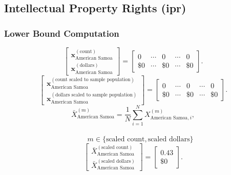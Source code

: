 \subsection{Intellectual Property Rights (\gls{ipr})}\label{sec:ipr}
\subsubsection{Lower Bound Computation}
\[
\begin{bmatrix}
\mathbf{x}_{\text{American Samoa}}^{(\text{count})}\\
\mathbf{x}_{\text{American Samoa}}^{(\text{dollars})}
\end{bmatrix}
=
\begin{bmatrix}
0 & \cdots & 0 & \cdots & 0\\
\$0 & \cdots & \$0 & \cdots & \$0
\end{bmatrix}.
\]
\[
\begin{bmatrix}
\mathbf{x}_{\text{American Samoa}}^{(\text{count scaled to sample population})}\\
\mathbf{x}_{\text{American Samoa}}^{(\text{dollars scaled to sample population})}
\end{bmatrix}
=
\begin{bmatrix}
0 & \cdots & 0 & \cdots & 0\\
\$0 & \cdots & \$0 & \cdots & \$0
\end{bmatrix}.
\]
\[
\bar{X}_{\text{American Samoa}}^{(m)}
= \frac{1}{N}\sum_{i=1}^{N} X_{\text{American Samoa},i}^{(m)},
\]
\\
\[
\qquad
m \in \{\text{scaled count},\text{scaled dollars}\}
\]
\[
\begin{bmatrix}
\bar{X}_{\text{American Samoa}}^{(\text{scaled count})}\\
\bar{X}_{\text{American Samoa}}^{(\text{scaled dollars})}
\end{bmatrix}
=
\begin{bmatrix}
0.43\\
\$0
\end{bmatrix}.
\]
